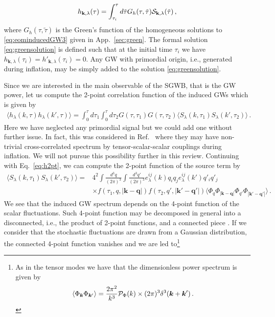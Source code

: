 \documentclass[a4paper,11pt]{article}
\numberwithin{equation}{section}
\begin{document}
\begin{equation}\label{eq:greensolution}
h_{\mathbf{k},\lambda}(\tau)=\int_{\tau_i}^{\tau}d\tilde\tau G_h(\tau,\tilde \tau){\cal S}_{\mathbf{k},\lambda}(\tilde\tau)\,,
\end{equation}
where $G_h(\tau,\tilde \tau)$ is the Green's function of the homogeneous solutions to \eqref{eq:eominducedGW3} given in App.~\ref{sec:green}. The formal solution \eqref{eq:greensolution} is defined such that at the initial time $\tau_i$ we have $h_{\mathbf{k},\lambda}(\tau_i)=h'_{\mathbf{k},\lambda}(\tau_i)=0$. Any GW with primordial origin, i.e., generated during inflation, may be simply added to the solution \eqref{eq:greensolution}.

Since we are interested in the main observable of the SGWB, that is the GW power, let us compute the 2-point correlation function of the induced GWs which is given by
\begin{align}\label{eq:h2pt}
\langle h_\lambda(k,\tau)h_\lambda(k',\tau)\rangle=\int_0^\tau d\tau_1\int_0^\tau d\tau_2G(\tau,\tau_1)G(\tau,\tau_2)\langle S_\lambda(k,\tau_1)S_\lambda(k',\tau_2)\rangle\,.
\end{align}
Here we have neglected any primordial signal but we could add one without further issue. In fact, this was considered in Ref.~\cite{Garcia-Bellido:2017aan} where they may have non-trivial cross-correlated spectrum by tensor-scalar-scalar couplings during inflation. We will not pursue this possibility further in this review. Continuing with Eq.~\eqref{eq:h2pt}, we can compute the 2-point function of the source term by
\begin{align}\label{eq:sl}
\langle S_\lambda(k,\tau_1)S_\lambda(k',\tau_2)\rangle=&4^2\int \frac{d^3q}{(2\pi)^3}\int \frac{d^3q'}{(2\pi)^3}e_\lambda^{ij}(k)q_iq_je_\lambda^{ij}(k')q'_iq'_j\nonumber\\&\times f(\tau_1,q,|\mathbf{k}-\mathbf{q}|)f(\tau_2,q',|\mathbf{k}'-\mathbf{q}'|)
\langle\Phi_q\Phi_{|\mathbf{k}-\mathbf{q}|}\Phi_{q'}\Phi_{|\mathbf{k}'-\mathbf{q}'|}\rangle\,.
\end{align}
We see that the induced GW spectrum depends on the 4-point function of the scalar fluctuations. Such 4-point function may be decomposed in general into a disconnected, i.e., the product of 2-point functions, and a connected piece \cite{Cai:2018dig}. If we consider that the stochastic fluctuations are drawn from a Gaussian distribution, the connected 4-point function vanishes and we are led to\footnote{As in the tensor modes we have that the dimensionless power spectrum is given by
\begin{equation*}\label{eq:PP}
\langle \Phi_{\bm{k}}\Phi_{\bm{k}'}\rangle= \frac{2\pi^2}{k^3}{\cal P}_{\Phi}(k)\times (2\pi)^3\delta^{3}(\bm{k}+\bm{k}')\,.
\end{equation*}
}
\end{document}

